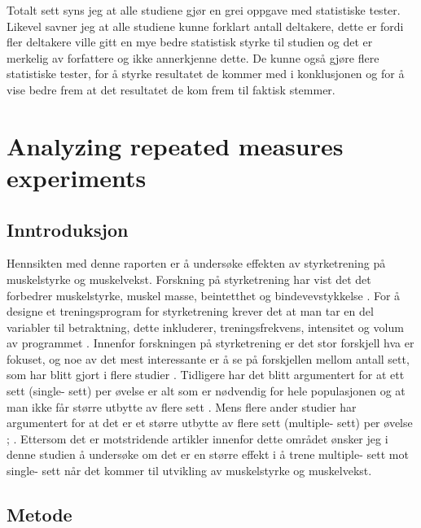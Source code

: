 \documentclass[
]{book}
\begin{document}
Totalt sett syns jeg at alle studiene gjør en grei oppgave med statistiske tester. Likevel savner jeg at alle studiene kunne forklart antall deltakere, dette er fordi fler deltakere ville gitt en mye bedre statistisk styrke til studien og det er merkelig av forfattere og ikke annerkjenne dette. De kunne også gjøre flere statistiske tester, for å styrke resultatet de kommer med i konklusjonen og for å vise bedre frem at det resultatet de kom frem til faktisk stemmer.

\hypertarget{analyzing-repeated-measures-experiments}{%
\chapter{Analyzing repeated measures experiments}\label{analyzing-repeated-measures-experiments}}

\hypertarget{inntroduksjon-1}{%
\section{Inntroduksjon}\label{inntroduksjon-1}}

Hennsikten med denne raporten er å undersøke effekten av styrketrening på muskelstyrke og muskelvekst.
Forskning på styrketrening har vist det det forbedrer muskelstyrke, muskel masse, beintetthet og bindevevstykkelse \citep{kraemer2002a}. For å designe et treningsprogram for styrketrening krever det at man tar en del variabler til betraktning, dette inkluderer, treningsfrekvens, intensitet og volum av programmet \citep{hass2001a}. Innenfor forskningen på styrketrening er det stor forskjell hva er fokuset, og noe av det mest interessante er å se på forskjellen mellom antall sett, som har blitt gjort i flere studier \citep{krieger2010a}. Tidligere har det blitt argumentert for at ett sett (single- sett) per øvelse er alt som er nødvendig for hele populasjonen og at man ikke får større utbytte av flere sett \citep{carpinelli1998c}. Mens flere ander studier har argumentert for at det er et større utbytte av flere sett (multiple- sett) per øvelse \citet{galvão2005a}; \citet{humburg2007e}. Ettersom det er motstridende artikler innenfor dette området ønsker jeg i denne studien å undersøke om det er en større effekt i å trene multiple- sett mot single- sett når det kommer til utvikling av muskelstyrke og muskelvekst.

\hypertarget{metode-2}{%
\section{Metode}\label{metode-2}}
\end{document}
